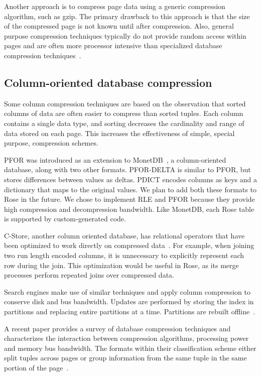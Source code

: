 \documentclass{vldb}
\newcommand{\rows}{Rose\xspace}
\newcommand{\xxx}[1]{\textcolor{red}{\bf XXX: #1}}
\renewcommand{\xxx}[1]{\xspace}
\begin{document}
Another approach is to compress page data using a generic compression
algorithm, such as gzip.  The primary drawback to this approach is
that the size of the compressed page is not known until after
compression.  Also, general purpose compression techniques typically
do not provide random access within pages and are often more processor
intensive than specialized database compression
techniques~\cite{rowImplementationPerf}.

\subsection{Column-oriented database compression}

Some column compression techniques are based on the observation that sorted
columns of data are often easier to compress than sorted tuples.  Each
column contains a single data type, and sorting decreases the
cardinality and range of data stored on each page.  This increases the
effectiveness of simple, special purpose, compression schemes.

PFOR was introduced as an extension to
MonetDB~\cite{pfor}, a column-oriented database, along with two other
formats.  PFOR-DELTA is similar to PFOR, but stores differences between values as
deltas.\xxx{check}  PDICT encodes columns as keys and a dictionary that
maps to the original values.  We plan to add both these formats to
\rows in the future.  We chose to implement RLE and PFOR because they
provide high compression and decompression bandwidth.  Like MonetDB,
each \rows table is supported by custom-generated code.

C-Store, another column oriented database, has relational operators
that have been optimized to work directly on compressed
data~\cite{compExec}.  For example, when joining two run length encoded
columns, it is unnecessary to explicitly represent each row during the
join.  This optimization would be useful in \rows, as its
merge processes perform repeated joins over compressed data.

Search engines make use of similar techniques and apply column compression to conserve
disk and bus bandwidth.  Updates are performed by storing the index in
partitions and replacing entire partitions at a
time.  Partitions are rebuilt offline~\cite{searchengine}.

A recent paper provides a survey of database compression techniques
and characterizes the interaction between compression algorithms,
processing power and memory bus bandwidth.  The formats within their
classification scheme either split tuples across pages or group
information from the same tuple in the same portion of the
page~\cite{bitsForChronos}.
\end{document}
